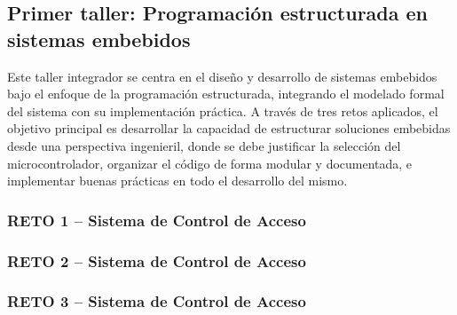 
\subsection{Primer taller: Programación estructurada en sistemas embebidos} %

Este taller integrador se centra en el diseño y desarrollo de sistemas embebidos bajo el enfoque de la programación estructurada, integrando el modelado formal del sistema con su implementación práctica. A través de tres retos aplicados, el objetivo principal es desarrollar la capacidad de estructurar soluciones embebidas desde una perspectiva ingenieril, donde se debe justificar la selección del microcontrolador, organizar el código de forma modular y documentada, e implementar buenas prácticas en todo el desarrollo del mismo.

\subsubsection{RETO 1 – Sistema de Control de Acceso}\label{sec:reto1}
  


\subsubsection{RETO 2 – Sistema de Control de Acceso}\label{sec:reto2}
  


\subsubsection{RETO 3 – Sistema de Control de Acceso}\label{sec:reto3}
  








